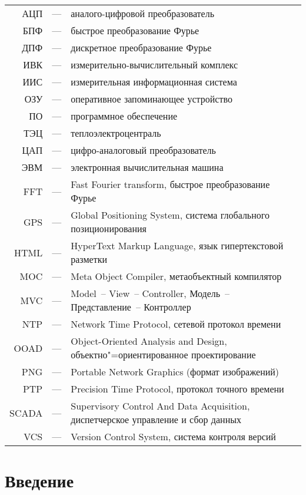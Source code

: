 \documentclass[a4paper, 14pt, titlepage]{extarticle}
\newcounter{firstpage}
\newcommand\firstPageHere{\setcounter{firstpage}{\value{page}}}
\newcommand\sectiontoc[1]{\section*{\centering #1}\addcontentsline{toc}{section}{#1}}
\newcommand{\eng}[1]{\foreignlanguage{english}{#1}}
\let\oldsection\section
\renewcommand{\section}{\newpage\oldsection}
\begin{document}
  \begin{tabular}{r c p{12cm}} %
    АЦП & --- & аналого-цифровой преобразователь \\
    БПФ & --- & быстрое преобразование Фурье \\
    ДПФ & --- & дискретное преобразование Фурье \\
    ИВК & --- & измерительно-вычислительный комплекс \\
    ИИС & --- & измерительная информационная система \\
    ОЗУ & --- & оперативное запоминающее устройство \\
    ПО  & --- & программное обеспечение \\
    ТЭЦ & --- & теплоэлектроцентраль \\
    ЦАП & --- & цифро-аналоговый преобразователь \\
    ЭВМ & --- & электронная вычислительная машина \\[\baselineskip]

    FFT & --- & \eng{Fast Fourier transform}, быстрое преобразование Фурье \\
    GPS & --- & \eng{Global Positioning System}, система глобального позиционирования \\
    HTML& --- & \eng{HyperText Markup Language}, язык гипертекстовой разметки \\
    MOC & --- & \eng{Meta Object Compiler}, метаобъектный компилятор \\
    MVC & --- & \eng{Model~-- View~-- Controller}, Модель~-- Представление~-- Контроллер \\
    NTP & --- & \eng{Network Time Protocol}, сетевой протокол времени \\
    OOAD& --- & \eng{Object-Oriented Analysis and Design}, объектно"=ориентированное проектирование \\
    PNG & --- & \eng{Portable Network Graphics} (формат изображений) \\
    PTP & --- & \eng{Precision Time Protocol}, протокол точного времени \\
    SCADA & --- & \eng{Supervisory Control And Data Acquisition}, диспетчерское управление и сбор данных \\
    VCS & --- & \eng{Version Control System}, система контроля версий \\
  \end{tabular}

  \firstPageHere
  \sectiontoc{Введение}\label{sec:intro}
\end{document}
